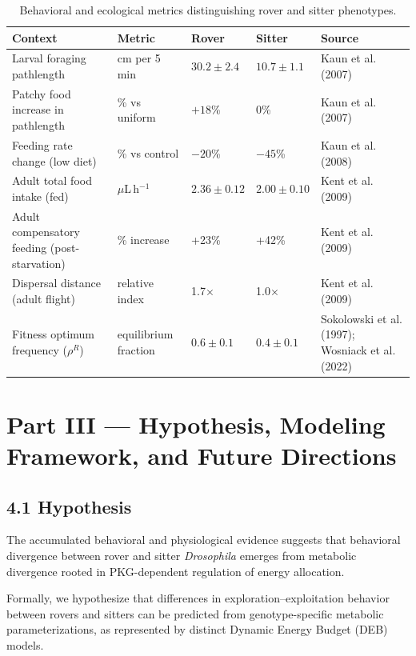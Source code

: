 \documentclass[11pt]{article}
\begin{document}
\begin{table}[ht]
  \centering
  \begin{tabular}{lllll}
    \toprule
    Context & Metric & Rover & Sitter & Source \\
    \midrule
    Larval foraging pathlength & cm per 5 min & $30.2 \pm 2.4$ & $10.7 \pm 1.1$ & Kaun et al. (2007) \\
    Patchy food increase in pathlength & \% vs uniform & $+18$\% & 0\% & Kaun et al. (2007) \\
    Feeding rate change (low diet) & \% vs control & $-20$\% & $-45$\% & Kaun et al. (2008) \\
    Adult total food intake (fed) & $\mu$L\,h$^{-1}$ & $2.36 \pm 0.12$ & $2.00 \pm 0.10$ & Kent et al. (2009) \\
    Adult compensatory feeding (post-starvation) & \% increase & +23\% & +42\% & Kent et al. (2009) \\
    Dispersal distance (adult flight) & relative index & 1.7$\times$ & 1.0$\times$ & Kent et al. (2009) \\
    Fitness optimum frequency ($\rho^R$) & equilibrium fraction & $0.6 \pm 0.1$ & $0.4 \pm 0.1$ & Sokolowski et al. (1997); Wosniack et al. (2022) \\
    \bottomrule
  \end{tabular}
  \caption{Behavioral and ecological metrics distinguishing rover and sitter phenotypes.}
\end{table}

\section*{Part III --- Hypothesis, Modeling Framework, and Future Directions}

\subsection*{4.1 Hypothesis}

The accumulated behavioral and physiological evidence suggests that behavioral divergence between rover and sitter \emph{Drosophila} emerges from metabolic divergence rooted in PKG-dependent regulation of energy allocation.

Formally, we hypothesize that differences in exploration--exploitation behavior between rovers and sitters can be predicted from genotype-specific metabolic parameterizations, as represented by distinct Dynamic Energy Budget (DEB) models.
\end{document}
